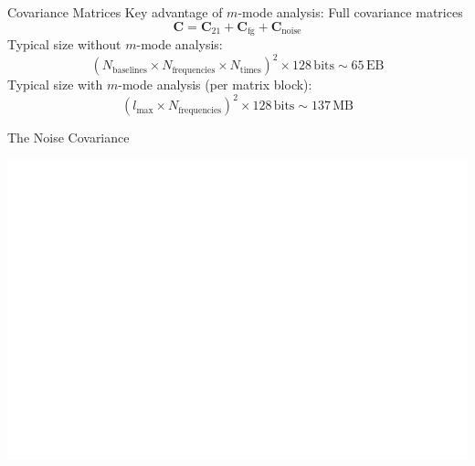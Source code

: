 \documentclass{beamer}
\renewcommand{\b}{\pmb}
\begin{document}
\begin{frame}{Covariance Matrices}
    Key advantage of $m$-mode analysis: Full covariance matrices
    \Large
    \begin{dmath*}
        \b C = \b C_{\textrm{21}} + \b C_{\textrm{fg}} + \b C_{\textrm{noise}}
    \end{dmath*}
    \normalsize
    Typical size without $m$-mode analysis:
    \Large
    \begin{dmath*}
        (N_{\textrm{baselines}} \times N_{\textrm{frequencies}} \times N_{\textrm{times}})^2
            \times 128\,\textrm{bits} \sim 65\,\textrm{EB}
    \end{dmath*}
    \normalsize
    Typical size with $m$-mode analysis (per matrix block):
    \Large
    \begin{dmath*}
        (l_{\textrm{max}} \times N_{\textrm{frequencies}})^2
            \times 128\,\textrm{bits} \sim 137\,\textrm{MB}
    \end{dmath*}
    \normalsize
\end{frame}

\begin{frame}{The Noise Covariance}
    \begin{center}
        \includegraphics[height=0.75\textheight]{figures/system-temperature/system-temperature}
    \end{center}
\end{frame}
\end{document}
